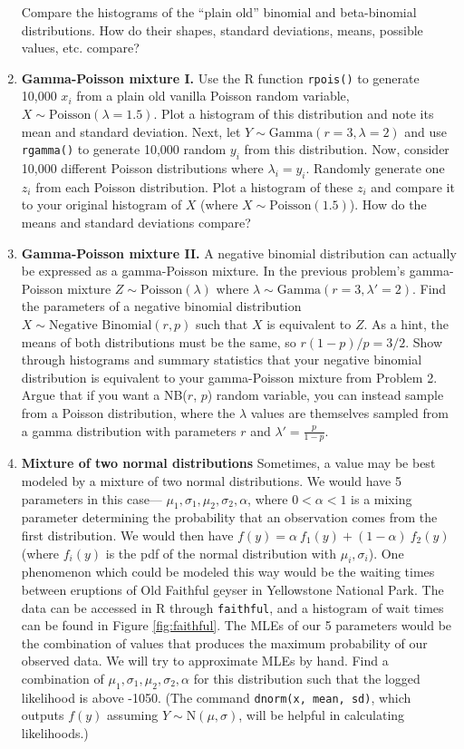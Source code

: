 \documentclass[
]{krantz}
\begin{document}
\begin{enumerate}
  Compare the histograms of the ``plain old'' binomial and beta-binomial distributions. How do their shapes, standard deviations, means, possible values, etc. compare?
\item
  \textbf{Gamma-Poisson mixture I.} Use the R function \texttt{rpois()} to generate 10,000 \(x_i\) from a plain old vanilla Poisson random variable, \(X \sim \textrm{Poisson}(\lambda=1.5)\). Plot a histogram of this distribution and note its mean and standard deviation. Next, let \(Y \sim \textrm{Gamma}(r = 3, \lambda = 2)\) and use \texttt{rgamma()} to generate 10,000 random \(y_i\) from this distribution. Now, consider 10,000 different Poisson distributions where \(\lambda_i = y_i\). Randomly generate one \(z_i\) from each Poisson distribution. Plot a histogram of these \(z_i\) and compare it to your original histogram of \(X\) (where \(X \sim \textrm{Poisson}(1.5)\)). How do the means and standard deviations compare?
\item
  \textbf{Gamma-Poisson mixture II.} A negative binomial distribution can actually be expressed as a gamma-Poisson mixture.
  In the previous problem's gamma-Poisson mixture \(Z \sim \textrm{Poisson}(\lambda)\) where \(\lambda \sim \textrm{Gamma}(r = 3, \lambda' = 2)\).
  Find the parameters of a negative binomial distribution \(X \sim \textrm{Negative Binomial}(r, p)\) such that \(X\) is equivalent to \(Z\). As a hint, the means of both distributions must be the same, so \(r(1-p)/p = 3/2\). Show through histograms and summary statistics that your negative binomial distribution is equivalent to your gamma-Poisson mixture from Problem 2. Argue that if you want a NB(\(r\), \(p\)) random variable, you can instead sample from a Poisson distribution, where the \(\lambda\) values are themselves sampled from a gamma distribution with parameters \(r\) and \(\lambda' = \frac{p}{1-p}\).
\item
  \textbf{Mixture of two normal distributions} Sometimes, a value may be best modeled by a mixture of two normal distributions. We would have 5 parameters in this case--- \(\mu_1, \sigma_1, \mu_2, \sigma_2, \alpha\), where \(0 < \alpha < 1\) is a mixing parameter determining the probability that an observation comes from the first distribution. We would then have \(f(y) = \alpha\ f_1(y) + (1-\alpha)\ f_2(y)\) (where \(f_i(y)\) is the pdf of the normal distribution with \(\mu_i, \sigma_i\)). One phenomenon which could be modeled this way would be the waiting times between eruptions of Old Faithful geyser in Yellowstone National Park. The data can be accessed in R through \texttt{faithful}, and a histogram of wait times can be found in Figure \ref{fig:faithful}. The MLEs of our 5 parameters would be the combination of values that produces the maximum probability of our observed data. We will try to approximate MLEs by hand. Find a combination of \(\mu_1, \sigma_1, \mu_2, \sigma_2, \alpha\) for this distribution such that the logged likelihood is above -1050. (The command \texttt{dnorm(x,\ mean,\ sd)}, which outputs \(f(y)\) assuming \(Y \sim \textrm{N}(\mu, \sigma)\), will be helpful in calculating likelihoods.)
\end{enumerate}
\end{document}

